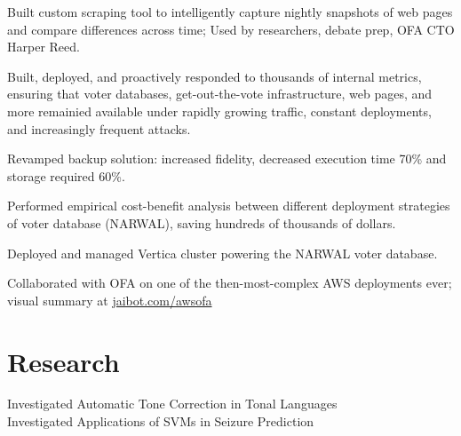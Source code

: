 \documentclass[]{resume}
\begin{document}
\begin{minipage}[t]{0.66\textwidth}
\descript{}
\begin{tightemize}
\item Built custom scraping tool to intelligently capture nightly snapshots of web pages and compare differences across time; Used by researchers, debate prep, OFA CTO Harper Reed.
\item Built, deployed, and proactively responded to thousands of internal metrics, ensuring that voter databases, get-out-the-vote infrastructure, web pages, and more remainied available under rapidly growing traffic, constant deployments, and increasingly frequent attacks.
\item Revamped backup solution: increased fidelity, decreased execution time 70\% and storage required 60\%.
\item Performed empirical cost-benefit analysis between different deployment strategies of voter database (NARWAL), saving hundreds of thousands of dollars.
\item Deployed and managed Vertica cluster powering the NARWAL voter database.
\item Collaborated with OFA on one of the then-most-complex AWS deployments ever; visual summary at \href{http://www.jaibot.com/awsofa}{jaibot.com/awsofa}
\end{tightemize}
\sectionsep


\section{Research}

Investigated Automatic Tone Correction in Tonal Languages
\sectionsep\\
Investigated Applications of SVMs in Seizure Prediction




% 
% 

\end{minipage} 
\end{document}
